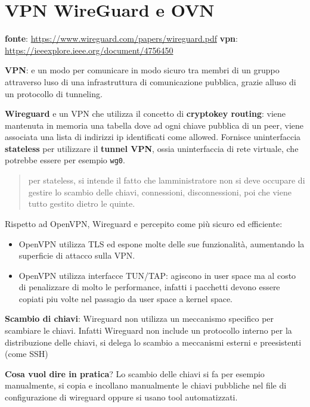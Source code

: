 \section{VPN WireGuard e OVN}\label{vpn-wireguard-e-ovn}

\textbf{fonte}: \url{https://www.wireguard.com/papers/wireguard.pdf}
\textbf{vpn}: \url{https://ieeexplore.ieee.org/document/4756450}

\textbf{VPN}: e\textquotesingle{} un modo per comunicare in modo sicuro
tra membri di un gruppo attraverso l\textquotesingle uso di una
infrastruttura di comunicazione pubblica, grazie all\textquotesingle uso
di un protocollo di tunneling.

\textbf{Wireguard} e\textquotesingle{} un VPN che utilizza il concetto
di \textbf{cryptokey routing}: viene mantenuta in memoria una tabella
dove ad ogni chiave pubblica di un peer, viene associata una lista di
indirizzi ip identificati come allowed. Fornisce
un\textquotesingle interfaccia \textbf{stateless} per utilizzare il
\textbf{tunnel VPN}, ossia un\textquotesingle interfaccia di rete
virtuale, che potrebbe essere per esempio \passthrough{\lstinline!wg0!}.

\begin{quote}
per stateless, si intende il fatto che l\textquotesingle amministratore
non si deve occupare di gestire lo scambio delle chiavi, connessioni,
disconnessioni, poi che viene tutto gestito dietro le quinte.
\end{quote}

Rispetto ad OpenVPN, Wireguard e\textquotesingle{} percepito come più
sicuro ed efficiente:

\begin{itemize}
\tightlist
\item
  OpenVPN utilizza TLS ed espone molte delle sue funzionalità,
  aumentando la superficie di attacco sulla VPN.
\item
  OpenVPN utilizza interfacce TUN/TAP: agiscono in user space ma al
  costo di penalizzare di molto le performance, infatti i pacchetti
  devono essere copiati piu volte nel passagio da user space a kernel
  space.
\end{itemize}

\textbf{Scambio di chiavi}: Wireguard non utilizza un meccanismo
specifico per scambiare le chiavi. Infatti Wireguard non include un
protocollo interno per la distribuzione delle chiavi, si delega lo
scambio a meccanismi esterni e preesistenti (come SSH)

\textbf{Cosa vuol dire in pratica}? Lo scambio delle chiavi si fa per
esempio manualmente, si copia e incollano manualmente le chiavi
pubbliche nel file di configurazione di wireguard oppure si usano tool
automatizzati.

